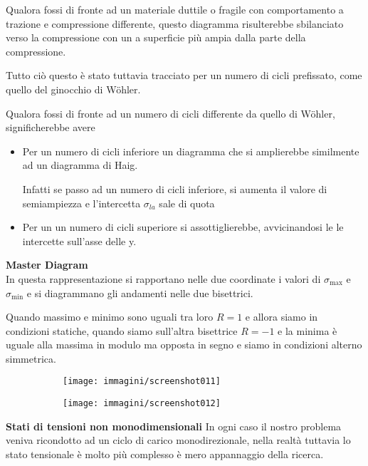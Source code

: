 \documentclass{article}
\begin{document}
\begin{adjustwidth}{2in}{}
			Qualora fossi di fronte ad un materiale duttile o fragile con comportamento a trazione e compressione differente, questo diagramma risulterebbe sbilanciato verso la compressione con un a superficie più ampia dalla parte della compressione. \newline
			
			Tutto ciò questo è stato tuttavia tracciato per un numero di cicli prefissato, come quello del ginocchio di Wöhler. 
			
			Qualora fossi di fronte ad un numero di cicli differente da quello di Wöhler, significherebbe avere
				\begin{itemize}
				\item Per un numero di cicli inferiore un diagramma che si amplierebbe similmente ad un diagramma di Haig. 
				
				Infatti se passo ad un numero di cicli inferiore, si aumenta il valore di semiampiezza e l'intercetta $\sigma_{la}$ sale di quota
				
				\item Per un un numero di cicli superiore si assottiglierebbe, avvicinandosi le le intercette sull'asse delle y. 
				
			\end{itemize} 
			
\newpage
			{\large \textbf{Master Diagram}}\\						
			In questa rappresentazione si rapportano nelle due coordinate i valori di $\sigma_{\max}$ e $\sigma_{\min}$ e si diagrammano gli andamenti nelle due bisettrici. 
				
			Quando massimo e minimo sono uguali tra loro $R=1$ e allora siamo in condizioni statiche, quando siamo sull'altra bisettrice $R=-1$ e la minima è uguale alla massima in modulo ma opposta in segno e siamo in condizioni alterno simmetrica.
			\begin{figure}[htbp]
				\begin{subfigure}{0.5\textwidth}
					\centering
				\texttt{[image: immagini/screenshot011]}
				\end{subfigure}%
				\begin{subfigure}{0.5\textwidth}
					\centering
				\texttt{[image: immagini/screenshot012]}
				\end{subfigure}
			\end{figure}
			
\textbf{{\LARGE Stati di tensioni non monodimensionali}} \mbox{} \newline						
			In ogni caso il nostro problema veniva ricondotto ad un ciclo di carico monodirezionale, nella realtà tuttavia lo stato tensionale è molto più complesso è mero appannaggio della ricerca. \newline
			

\end{adjustwidth}
\end{document}
